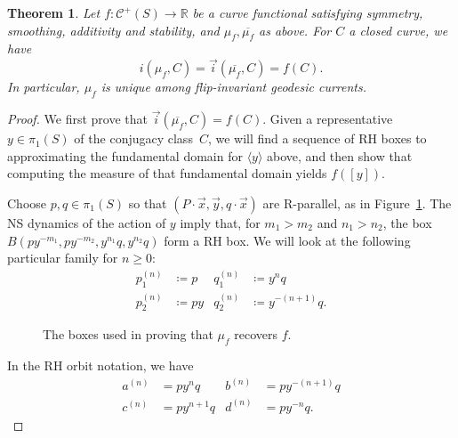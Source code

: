 \documentclass[11pt]{amsart}
\newcommand{\ora}[1]{\overrightarrow{#1}}
\newcommand*{\svgfignormal}[1]{\fontsize{9pt}{9pt}\selectfont}
\numberwithin{equation}{section}
\numberwithin{figure}{section}
\newtheorem{theorem}{Theorem}[section]
\theoremstyle{definition}
\theoremstyle{plain}
\newcommand{\Curves}{\mathcal{C}}
\begin{document}
\begin{theorem}
Let $f \colon \Curves^+(S) \to \mathbb{R}$ be a curve functional satisfying symmetry, smoothing, additivity and stability, and $\mu_f, \overline{\mu_f}$ as above.
For $C$ a closed curve, we have
\[
i(\mu_f,C)=\vec{i}(\overline{\mu_f},C)=f(C).
\]
In particular, $\mu_f$ is unique among flip-invariant geodesic currents.
\label{prop:recoverintersection}
\end{theorem}
\begin{proof}
We first prove that $\vec{i}(\overline{\mu_f},C)=f(C)$. Given a representative $y \in
\pi_1(S)$ of the conjugacy class~$C$, we will find a sequence of
RH boxes to approximating the fundamental domain for $\langle
y\rangle$ above, and then show that computing the measure of that
fundamental domain yields $f([y])$.

Choose $p,q \in \pi_1(S)$ so that $(P\cdot \ora{x}, \ora{y},
q\cdot\ora{x})$ are R-parallel, as in Figure~\ref{fig:recover-f}.
The NS dynamics of the action of $y$ imply that, for $m_1
> m_2$ and $n_1 > n_2$, the box
$B(py^{-m_1},py^{-m_2},y^{n_1}q,y^{n_2}q)$ form a RH box. We will look
at the following particular family for $n \ge 0$:
\begin{align*}
  p_1^{(n)} &\coloneqq p & q_1^{(n)}&\coloneqq y^n q\\
  p_2^{(n)} &\coloneqq p y &q_2^{(n)} &\coloneqq y^{-(n+1)} q.
\end{align*}

\begin{figure}
\centering{
\svgfignormal{recover-f}}
\caption{The boxes used in proving that $\mu_f$ recovers $f$.}
  \label{fig:recover-f}
\end{figure}

In the RH orbit notation, we have
\begin{align*}
  a^{(n)} &= p y^{n}   q &  b^{(n)} &= p y^{-(n+1)} q \\
  c^{(n)} &= p y^{n+1} q &  d^{(n)} &= p y^{-n} q.
\end{align*}


\end{proof}
\end{document}
